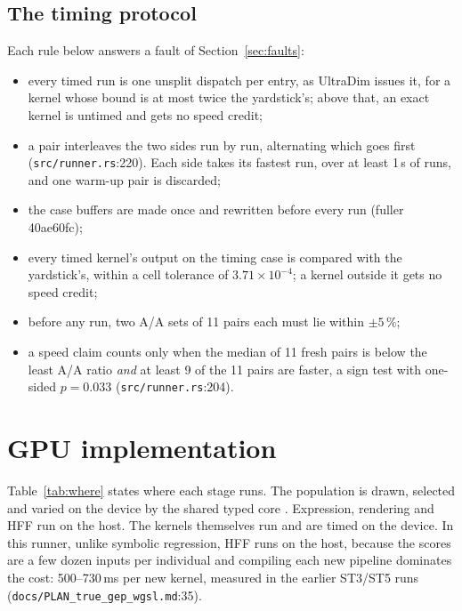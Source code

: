 \documentclass[sigconf,nonacm]{acmart}
\newcommand{\src}[1]{{\footnotesize\nolinkurl{#1}}}
\begin{document}
\subsection{The timing protocol}
Each rule below answers a fault of Section~\ref{sec:faults}:
\begin{itemize}
\item every timed run is one unsplit dispatch per entry, as UltraDim issues it,
  for a kernel whose bound is at most twice the yardstick's; above that, an
  exact kernel is untimed and gets no speed credit;
\item a pair interleaves the two sides run by run, alternating which goes
  first (\src{src/runner.rs}:220). Each side takes its fastest run, over at
  least 1\,s of runs, and one warm-up pair is discarded;
\item the case buffers are made once and rewritten before every run (fuller
  40ae60fc);
\item every timed kernel's output on the timing case is compared with the
  yardstick's, within a cell tolerance of $3.71\times10^{-4}$; a kernel
  outside it gets no speed credit;
\item before any run, two A/A sets of 11 pairs each must lie within
  $\pm5\,\%$;
\item a speed claim counts only when the median of 11 fresh pairs is below the
  least A/A ratio \emph{and} at least 9 of the 11 pairs are faster, a sign
  test with one-sided $p=0.033$ (\src{src/runner.rs}:204).
\end{itemize}

\section{GPU implementation}

Table~\ref{tab:where} states where each stage runs. The population is drawn,
selected and varied on the device by the shared typed core \cite{morgan_core}.
Expression, rendering and HFF run on the host. The kernels themselves run and
are timed on the device. In this runner, unlike symbolic regression, HFF runs
on the host, because the scores are a few dozen inputs per individual and
compiling each new pipeline dominates the cost: 500--730\,ms per new kernel,
measured in the earlier ST3/ST5 runs (\src{docs/PLAN_true_gep_wgsl.md}:35).
\end{document}
